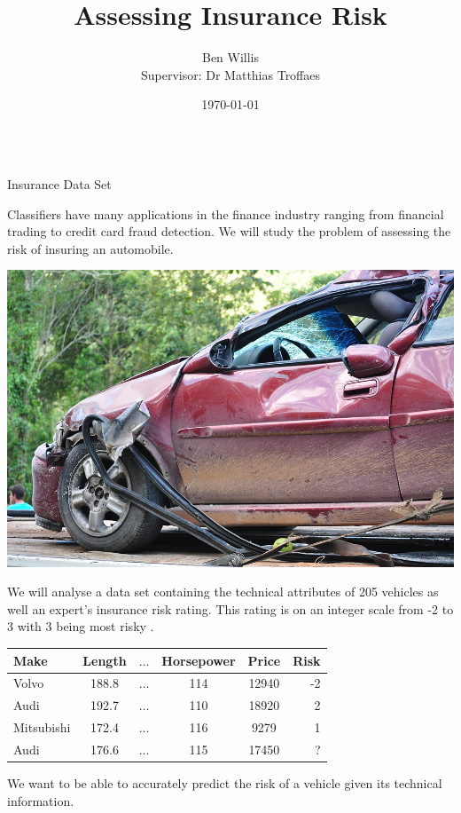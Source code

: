 \documentclass{beamer}
\title{Assessing Insurance Risk}
\author[Ben Willis]{Ben Willis\\\normalsize{ Supervisor: Dr Matthias Troffaes}}
\institute{Durham University}
\date{\today}
\begin{document}
\begin{frame}
\begin{columns}
	\begin{column}{0.30\paperwidth}

		\begin{block}{Insurance Data Set}

			Classifiers have many applications in the finance industry ranging from financial trading to credit card fraud detection.
			We will study the problem of assessing the risk of insuring an automobile. \vspace{0.5em}

			\begin{center}
				\includegraphics[width=.4\textwidth, keepaspectratio]{img/crash}
			\end{center}

			We will analyse a data set containing the technical attributes of 205 vehicles as well an expert's insurance risk rating.
			This rating is on an integer scale from -2 to 3 with 3 being most risky \cite{Automobile}.

			\begin{center}
				\begin{tabular}{l c c c c|r}
					Make       & Length & $\dots$ & Horsepower & Price & Risk \\
					\hline
					Volvo      & 188.8  & $\dots$ & 114        & 12940 & -2   \\
					Audi       & 192.7  & $\dots$ & 110        & 18920 & 2    \\
					Mitsubishi & 172.4  & $\dots$ & 116        & 9279  & 1    \\
					Audi       & 176.6  & $\dots$ & 115        & 17450 & ?
				\end{tabular}
			\end{center}

			We want to be able to accurately predict the risk of a vehicle given its technical information.
		\end{block}


\end{column}
\end{columns}
\end{frame}
\end{document}
